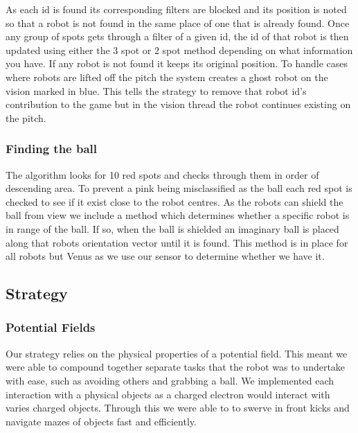 \documentclass[a4paper,12pt]{article}
\begin{document}
As each id is found its corresponding filters are blocked  and its position is noted so that a robot is not found in the same place of one that is already found. Once any group of spots gets through a filter of a given id, the id of that robot is then updated using either the 3 spot or 2 spot method depending on what information you have. If any robot is not found it keeps its original position. To handle cases where robots are lifted off the pitch the system creates a ghost robot on the vision marked in blue. This tells the strategy to remove that robot id's contribution to the game but in the vision thread the robot continues existing on the pitch.
\subsubsection{Finding the ball}
The algorithm looks for 10 red spots and checks through them in order of descending area. To prevent a pink being misclassified as the ball each red spot is checked to see if it exist close to the robot centres. As the robots can shield the ball from view we include a method which determines whether a specific robot is in range of the ball. If so, when the ball is shielded an imaginary ball is placed along that robots orientation vector until it is found. This method is in place for all robots but Venus as we use our sensor to determine whether we have it.
\subsection{Strategy}
\subsubsection{Potential Fields}
Our strategy relies on the physical properties of a potential field. This meant we were able to compound together separate tasks that the robot was to undertake with ease, such as avoiding others and grabbing a ball. We implemented each interaction with a physical objects as a charged electron would interact with varies charged objects. Through this we were able to to swerve in front kicks and navigate mazes of objects fast and efficiently. 
\end{document}
